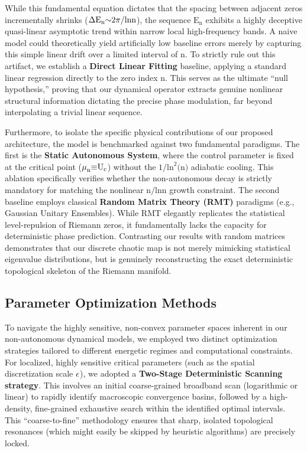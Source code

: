 \documentclass[fleqn,10pt]{wlscirep}
\begin{document}
While this fundamental equation dictates that the spacing between
adjacent zeros incrementally shrinks
(\(\text{\ensuremath{\Delta}}\text{E}_{\text{n}}\text{\ensuremath{\sim}2}\text{\ensuremath{\pi}}\text{/ln}\text{n}\)),
the sequence \(\text{E}_{\text{n}}\) exhibits a highly deceptive
quasi-linear asymptotic trend within narrow local high-frequency bands.
A naive model could theoretically yield artificially low baseline errors
merely by capturing this simple linear drift over a limited interval of
\(\text{n}\). To strictly rule out this artifact, we establish a
\textbf{Direct Linear Fitting} baseline, applying a standard linear
regression directly to the zero index \(\text{n}\). This serves as the
ultimate ``null hypothesis,'' proving that our dynamical operator
extracts genuine nonlinear structural information dictating the precise
phase modulation, far beyond interpolating a trivial linear sequence.

Furthermore, to isolate the specific physical contributions of our
proposed architecture, the model is benchmarked against two fundamental
paradigms. The first is the \textbf{Static Autonomous System}, where the
control parameter is fixed at the critical point
(\(\text{\ensuremath{\mu}}_{\text{n}}\text{\ensuremath{\equiv}}\text{U}_{\text{c}}\)) without the
\(\text{1/}\text{ln}^{\text{2}}\text{(}\text{n}\text{)}\) adiabatic
cooling. This ablation specifically verifies whether the non-autonomous
decay is strictly mandatory for matching the nonlinear
\(\text{n}\text{/ln}\text{n}\) growth constraint. The second baseline
employs classical \textbf{Random Matrix Theory (RMT)} paradigms (e.g.,
Gaussian Unitary Ensembles). While RMT elegantly replicates the
statistical level-repulsion of Riemann zeros, it fundamentally lacks the
capacity for deterministic phase prediction. Contrasting our results
with random matrices demonstrates that our discrete chaotic map is not
merely mimicking statistical eigenvalue distributions, but is genuinely
reconstructing the exact deterministic topological skeleton of the
Riemann manifold.

\subsection*{Parameter Optimization Methods}

To navigate the highly sensitive, non-convex parameter spaces inherent
in our non-autonomous dynamical models, we employed two distinct
optimization strategies tailored to different energetic regimes and
computational constraints. For localized, highly sensitive critical
parameters (such as the spatial discretization scale \(\text{\ensuremath{\epsilon}}\)), we
adopted a \textbf{Two-Stage Deterministic Scanning strategy}. This
involves an initial coarse-grained broadband scan (logarithmic or
linear) to rapidly identify macroscopic convergence basins, followed by
a high-density, fine-grained exhaustive search within the identified
optimal intervals. This ``coarse-to-fine'' methodology ensures that
sharp, isolated topological resonances (which might easily be skipped by
heuristic algorithms) are precisely locked.
\end{document}
